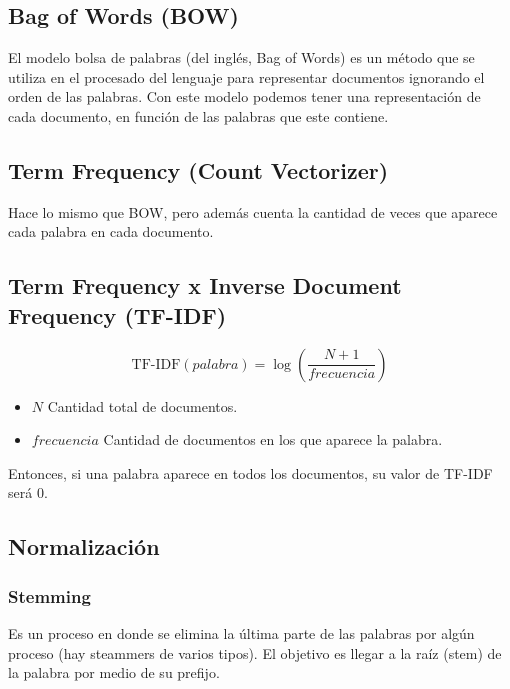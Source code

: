 \documentclass[../main.tex]{subfiles}
\begin{document}
    \subsection{Bag of Words (BOW)}
        El modelo bolsa de palabras (del inglés, Bag of Words) es un método que se utiliza en el procesado del lenguaje para representar documentos ignorando el orden de las palabras. Con este modelo podemos tener una representación de cada documento, en función de las palabras que este contiene.

    \subsection{Term Frequency (Count Vectorizer)}
        Hace lo mismo que BOW, pero además cuenta la cantidad de veces que aparece cada palabra en cada documento.

    
    \subsection{Term Frequency x Inverse Document Frequency (TF-IDF)}
        \begin{definition}
            \begin{equation}
                \text{TF-IDF}(palabra) = \log \left(\frac{N+1}{frecuencia}\right)
            \end{equation}

            \begin{itemize}
                \item $N$ Cantidad total de documentos.
                \item $frecuencia$ Cantidad de documentos en los que aparece la palabra.
            \end{itemize}

            Entonces, si una palabra aparece en todos los documentos, su valor de TF-IDF será 0.
        \end{definition}

    \subsection{Normalización}
        \subsubsection{Stemming}
            Es un proceso en donde se elimina la última parte de las palabras por algún proceso (hay steammers de varios tipos). El objetivo es llegar a la raíz (stem) de la palabra por medio de su prefijo.
\end{document}
